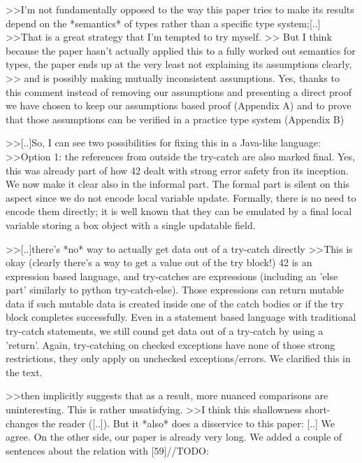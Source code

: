 >>I'm not fundamentally opposed to the way this paper tries to make its results depend on the *semantics* of types rather than a specific type system;[..]
>>That is a great strategy that I'm tempted to try myself.
>> But I think because the paper hasn't actually applied this to a fully worked out semantics for types, the paper ends up at the very least not explaining its assumptions clearly,
>> and is possibly making mutually inconsistent assumptions. 
Yes, thanks to this comment instead of removing our assumptions and presenting a direct proof we have chosen to keep our assumptions based proof (Appendix A)
and to prove that those assumptions can be verified in a practice type system (Appendix B)


>>[..]So, I can see two possibilities for fixing this in a Java-like language:
>>Option 1: the references from outside the try-catch are also marked final.
Yes, this was already part of how 42 dealt with strong error safety fron its inception. We now make it clear also in the informal part.
The formal part is silent on this aspect since we do not encode local variable update.
Formally, there is no need to encode them directly; it is well known that they can be emulated by a final local variable storing a box object with a single updatable field.


>>[..]there's *no* way to actually get data out of a try-catch directly
>>This is okay (clearly there's a way to get a value out of the try block!)
42 is an expression based language, and try-catches are expressions (including an 'else part' similarly to python try-catch-else).
Those expressions can return mutable data if such mutable data is created inside one of the catch bodies or if the try block completes successfully.
Even in a statement based language with traditional try-catch statements, we still cound get data out of a try-catch by using a 'return'.
Again, try-catching on checked exceptions have none of those strong restrictions, they only apply on unchecked exceptions/errors.
We clarified this in the text.

>>then implicitly suggests that as a result, more nuanced comparisons are uninteresting. This is rather unsatisfying.
>>I think this shallowness short-changes the reader ([..]). But it *also* does a disservice to this paper: [..]
We agree. On the other side, our paper is already very long.
We added a couple of sentences about the relation with [59]//TODO:


